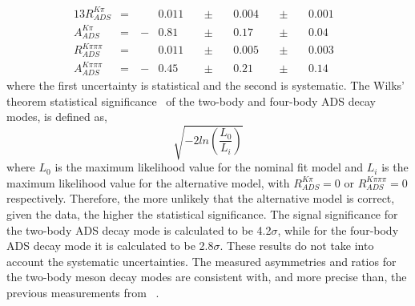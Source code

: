 \begin{alignat*}{13}
R_{ADS}^{K\pi} &= &\ &0.011&\ &\pm&\ &0.004&\ &\pm&\ &0.001& \\
A_{ADS}^{K\pi} &= &\ -&0.81&\ &\pm&\ &0.17&\ &\pm&\ &0.04& \\
R_{ADS}^{K\pi\pi\pi} &= &\ &0.011&\ &\pm&\ &0.005&\ &\pm&\ &0.003& \\
A_{ADS}^{K\pi\pi\pi} &= &\ -&0.45&\ &\pm&\ &0.21&\ &\pm&\ &0.14&
\end{alignat*}
where the first uncertainty is statistical and the second is systematic. The Wilks' theorem statistical significance~\cite{Wilks:1938dza} of the two-body and four-body ADS decay modes, is defined as,
\begin{equation}
\sqrt{-2ln\left(\frac{L_0}{L_i}\right)}
\end{equation}
where $L_0$ is the maximum likelihood value for the nominal \CP fit model and $L_i$ is the maximum likelihood value for the alternative model, with $R_{ADS}^{K\pi} = 0$ or $R_{ADS}^{K\pi\pi\pi} = 0$ respectively. Therefore, the more unlikely that the alternative model is correct, given the data, the higher the statistical significance. The signal significance for the two-body ADS decay mode is calculated to be 4.2$\sigma$, while for the four-body ADS decay mode it is calculated to be 2.8$\sigma$. These results do not take into account the systematic uncertainties. The measured asymmetries and ratios for the two-body \Dz meson decay modes are consistent with, and more precise than, the previous measurements from \babar~\cite{BaBarDKstar}.

